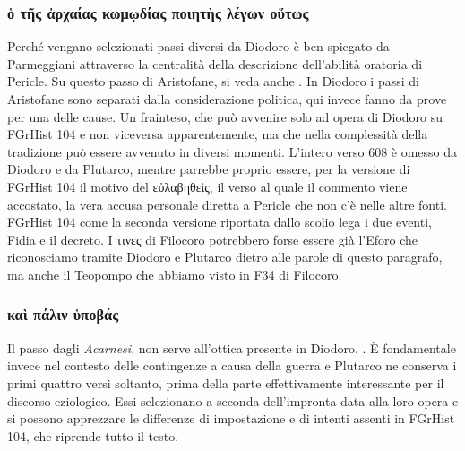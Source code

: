 {            \subsubsection{\textgreek{ὁ τῆς ἀρχαίας κωμῳδίας ποιητὴς λέγων οὕτως}}
            Perché vengano selezionati passi diversi da  Diodoro \label{bkm:RefHeading469751508721977} è ben spiegato da Parmeggiani attraverso la centralità della descrizione dell'abilità oratoria di Pericle. Su questo passo di Aristofane, si veda anche \cite[23s]{Cassio1982}. In  Diodoro i passi di Aristofane  sono separati dalla considerazione politica, qui invece fanno da prove per una delle cause. Un frainteso, che può avvenire solo ad opera di  Diodoro su FGrHist 104 e non viceversa apparentemente, ma che nella complessità della tradizione può essere avvenuto in diversi momenti.   L'intero verso 608 è omesso da  Diodoro e da Plutarco, mentre parrebbe proprio essere, per la versione di FGrHist 104 il motivo del  \textgreek{εὐλαβηθεὶς}, il verso al quale il commento viene accostato, la vera accusa personale diretta a Pericle  che non c'è nelle altre fonti. FGrHist 104 come la seconda versione riportata dallo scolio lega i due eventi, Fidia e il decreto. I \textgreek{τινες} di Filocoro potrebbero forse essere già l'Eforo che riconosciamo tramite  Diodoro e Plutarco dietro alle parole di questo paragrafo, ma anche il Teopompo  che abbiamo visto in F34 di Filocoro. 
                        
            \subsubsection{\textgreek{καὶ πάλιν ὑποβάς}}
            Il passo dagli \emph{Acarnesi},\label{bkm:RefHeading3610119231068} non serve all'ottica presente in Diodoro. \cite[436]{Parmeggiani2011}. È fondamentale invece nel contesto delle contingenze a causa della guerra e Plutarco ne conserva i primi quattro versi soltanto, prima della parte effettivamente interessante per il discorso eziologico. Essi selezionano a seconda dell'impronta data alla loro opera e si possono apprezzare le differenze di impostazione e di intenti assenti in FGrHist 104, che riprende tutto il testo.
            
}
